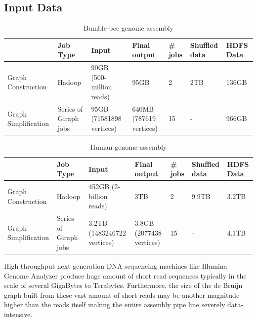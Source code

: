 \documentclass[conference]{IEEEtran}
\begin{document}
\subsection {Input Data} \label{InputData}
\begin{table}
\begin{center}
    \begin{tabular}{ |p{1.1cm} | p{0.8cm} | p{1.1cm} | p{0.8cm} | p{0.8cm} | p{0.8cm} | p{0.8cm}|} \hline
    & Job Type & Input & Final output & \# jobs & Shuffled data & HDFS Data \\ \hline
    Graph Construction & Hadoop & 90GB (500-million reads) & 95GB & 2 & 2TB & 136GB \\ \hline
    Graph Simplification & Series of Giraph jobs & 95GB (71581898 vertices) & 640MB (787619 vertices) & 15 & - & 966GB \\ \hline
    \end{tabular}
    \caption{Bumble-bee genome assembly}
	\label{table:BumbleBeeData}
\end{center}
\end{table}

\begin{table}
\begin{center}
    \begin{tabular}{ |p{1.1cm} | p{0.8cm} | p{1.1cm} | p{0.8cm} | p{0.8cm} | p{0.8cm} | p{0.8cm}|} \hline
    & Job Type & Input & Final output & \# jobs & Shuffled data & HDFS Data \\ \hline
    Graph Construction & Hadoop & 452GB (2-billion reads) & 3TB & 2 & 9.9TB & 3.2TB \\ \hline
    Graph Simplification & Series of Giraph jobs & 3.2TB (1483246722 vertices) & 3.8GB (2077438 vertices) & 15 & - & 4.1TB \\ \hline    
    \end{tabular}
    \caption{Human genome assembly}
	\label{table:HumanData}
\end{center}
\end{table}
High throughput next generation DNA sequencing machines like Illumina Genome Analyzer produce huge amount of short read sequences typically in the scale of several GigaBytes to Terabytes.
Furthermore, the size of the de Bruijn graph built from these vast amount of short reads may be another magnitude higher than the reads itself making the entire assembly pipe line severely data-intensive.
\end{document}
